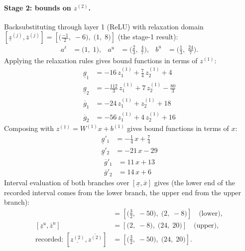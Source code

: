\documentclass[11pt]{article}
\begin{document}
\paragraph{Stage 2: bounds on $z^{(2)}$.}
Backsubstituting through layer 1 (ReLU) with relaxation domain $[\underline{z}^{(j)}, \overline{z}^{(j)}] = [\bigl(\frac{-1}{2},\; -6\bigr),\; \bigl(1,\; 8\bigr)]$ (the stage-1 result):
\begin{align*}
a^{\ell} &= \bigl(1,\; 1\bigr), & a^{u} &= \bigl(\frac{2}{3},\; \frac{4}{7}\bigr), & b^{u} &= \bigl(\frac{1}{3},\; \frac{24}{7}\bigr).
\end{align*}
Applying the relaxation rules gives bound functions in terms of $z^{(1)}$:
\begin{align*}
\underline{g}_{1} &= -16\,z^{(1)}_{1} + \frac{7}{4}\,z^{(1)}_{2} + 4 \\
\underline{g}_{2} &= -\frac{112}{3}\,z^{(1)}_{1} + 7\,z^{(1)}_{2} - \frac{80}{3}
\end{align*}
\begin{align*}
\overline{g}_{1} &= -24\,z^{(1)}_{1} + z^{(1)}_{2} + 18 \\
\overline{g}_{2} &= -56\,z^{(1)}_{1} + 4\,z^{(1)}_{2} + 16
\end{align*}
Composing with $z^{(1)} = W^{(1)} x + b^{(1)}$ gives bound functions in terms of $x$:
\begin{align*}
\underline{g}'_{1} &= -\frac{1}{4}\,x + \frac{7}{4} \\
\underline{g}'_{2} &= -21\,x - 29
\end{align*}
\begin{align*}
\overline{g}'_{1} &= 11\,x + 13 \\
\overline{g}'_{2} &= 14\,x + 6
\end{align*}
Interval evaluation of both branches over $[\underline{x}, \overline{x}]$ gives (the lower end of the recorded interval comes from the lower branch, the upper end from the upper branch):
\begin{align*}
[\underline{z}^{\ell}, \overline{z}^{\ell}] &= [\bigl(\frac{3}{2},\; -50\bigr),\; \bigl(2,\; -8\bigr)] \quad\text{(lower)}, \\
[\underline{z}^{u}, \overline{z}^{u}] &= [\bigl(2,\; -8\bigr),\; \bigl(24,\; 20\bigr)] \quad\text{(upper)}, \\
\text{recorded: } [\underline{z^{(2)}}, \overline{z^{(2)}}] &= [\bigl(\frac{3}{2},\; -50\bigr),\; \bigl(24,\; 20\bigr)].
\end{align*}
\end{document}
